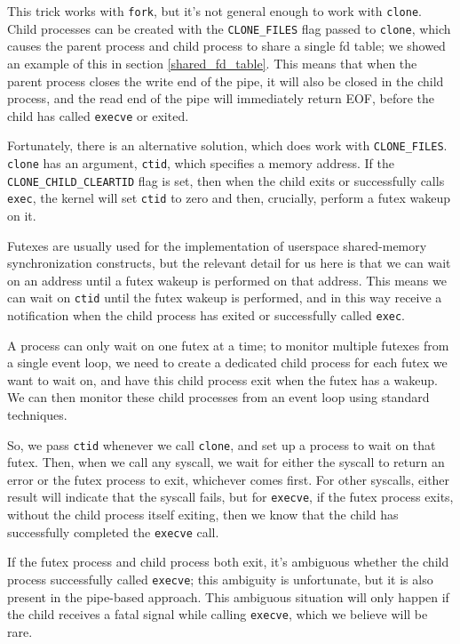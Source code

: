 \documentclass[letterpaper,twocolumn,10pt]{article}
\begin{document}
This trick works with \texttt{fork},
but it's not general enough to work with \texttt{clone}.
Child processes can be created with the \verb|CLONE_FILES| flag passed to \texttt{clone},
which causes the parent process and child process to share a single fd table;
we showed an example of this in section \ref{shared_fd_table}.
This means that when the parent process closes the write end of the pipe,
it will also be closed in the child process,
and the read end of the pipe will immediately return EOF,
before the child has called \texttt{execve} or exited.

Fortunately, there is an alternative solution, which does work with \verb|CLONE_FILES|.
\texttt{clone} has an argument, \texttt{ctid}, which specifies a memory address\cite{clone}.
If the \verb|CLONE_CHILD_CLEARTID| flag is set,
then when the child exits or successfully calls \texttt{exec},
the kernel will set \texttt{ctid} to zero and then,
crucially, perform a futex wakeup on it.

Futexes are usually used for the implementation of userspace shared-memory synchronization constructs\cite{futex},
but the relevant detail for us here is that we can wait on an address
until a futex wakeup is performed on that address.
This means we can wait on \texttt{ctid} until the futex wakeup is performed,
and in this way receive a notification when the child process has exited or successfully called \texttt{exec}.

A process can only wait on one futex at a time;
to monitor multiple futexes from a single event loop,
we need to create a dedicated child process for each futex we want to wait on,
and have this child process exit when the futex has a wakeup.
We can then monitor these child processes from an event loop using standard techniques\cite{signalfd}\cite{pidfd}.

So, we pass \texttt{ctid} whenever we call \texttt{clone},
and set up a process to wait on that futex.
Then, when we call any syscall,
we wait for either the syscall to return an error or the futex process to exit,
whichever comes first.
For other syscalls, either result will indicate that the syscall fails,
but for \texttt{execve}, if the futex process exits,
without the child process itself exiting,
then we know that the child has successfully completed the \texttt{execve} call.

If the futex process and child process both exit,
it's ambiguous whether the child process successfully called \texttt{execve};
this ambiguity is unfortunate, but it is also present in the pipe-based approach.
This ambiguous situation will only happen
if the child receives a fatal signal while calling \texttt{execve},
which we believe will be rare.
\end{document}
